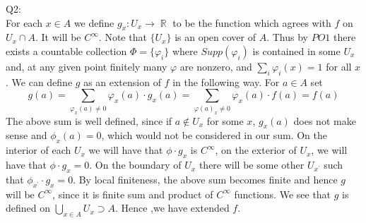 \documentclass[letterpaper]{article}
\DeclareMathOperator{\R}{\mathbb{R}}
\begin{document}
\noindent Q2: \\ 
For each $x\in A $ we define $g_x : U_x \to \R$ to be the function which agrees with $f$ on $U_x \cap A$. It will be $C^\infty$. Note that $\{ U_x\}$ is an open cover of $A$. 
Thus by $PO1$ there exists a countable collection $\Phi = \{ \varphi_i\}$ where $Supp (\varphi_i)$ is contained in some $U_x$ and, at any given point finitely many $\varphi$ are nonzero, and $\sum_i \varphi_i(x)= 1$ for all $x$. We can define $g$ as an extension of $f$ in the following way.  For $a\in A$ set
$$g(a) =\sum_{\varphi_x(a)\neq 0} \varphi_x(a) \cdot g_x(a) = \sum_{\varphi(a)_x\neq 0} \varphi_x(a) \cdot f(a) = f(a)$$ 
The above sum is well defined, since if $a \notin U_x$ for some $x$, $g_x(a)$ does not make sense and $\phi_x(a)=0$, which would not be considered in our sum. On the interior of each $U_x$ we will have that $\phi \cdot g_x$ is $C^\infty$, on the exterior of $U_x$, we will have that $\phi \cdot g_x=0$. On the boundary of $U_x$ there will be some other $U_{x^\prime}$ such that $\phi_{x^\prime}\cdot g_x=0$. 
By local finiteness, the above sum becomes finite and hence $g$ will be $C^\infty$, since it is finite sum and product of $C^\infty$ functions. We see that $g$ is defined on $\bigcup_{x\in A} U_x \supset A$. Hence ,we have extended $f$. 
\end{document}
